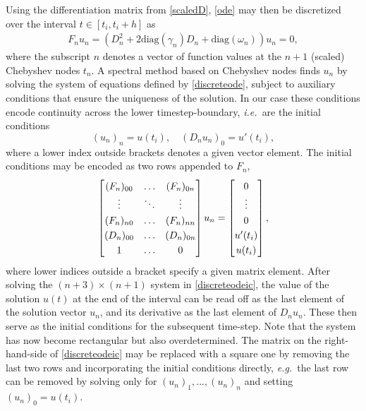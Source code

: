 \documentclass[10pt]{article}
\newcommand{\be}{\begin{equation}}
\newcommand{\ee}{\end{equation}}
\newcommand{\ie}{{\it i.e.\ }}
\newcommand{\eg}{{\it e.g.\ }}
\newcommand{\om}{\omega}
\newcommand{\g}{\gamma}
\begin{document}
Using the differentiation matrix from \cref{scaledD}, \cref{ode} may then be discretized over the interval $t \in [t_i, t_i+h]$ as
\begin{align}\label{discreteode}
    F_n u_n = \left(D_n^2 + 2\text{diag}(\g_n)D_n + \text{diag}(\om_n) \right)u_n = 0, 
\end{align}
where the subscript $n$ denotes a vector of function values at the $n+1$ (scaled) Chebyshev nodes $t_n$.
A spectral method based on Chebyshev nodes finds $u_n$ by solving the system of
equations defined by \cref{discreteode}, subject to auxiliary conditions that
ensure the uniqueness of the solution. In our case these conditions encode
continuity across the lower timestep-boundary, \ie are the initial conditions
\be\label{discreteic}
(u_n)_n = u(t_i), \quad \left(D_nu_n\right)_0 = u'(t_i),
\ee
where a lower index outside brackets denotes a given vector element.
The initial conditions may be encoded as two rows appended to $F_n$,
\be\label{discreteodeic}
\renewcommand*{\arraystretch}{1.25}
\begin{bmatrix}
    (F_n)_{00} & \ldots & (F_n)_{0n} \\
    \vdots & \ddots & \vdots \\
    (F_n)_{n0} & \ldots & (F_n)_{nn} \\
    (D_n)_{00} & \ldots & (D_n)_{0n} \\
    1 & \ldots & 0
\end{bmatrix}
u_n =  
\begin{bmatrix}
0 \\
\vdots \\
0 \\
u'(t_i) \\
u(t_i)
\end{bmatrix},
\ee
where lower indices outside a bracket specify a given matrix element.
After solving the $(n+3) \times (n+1)$ system in \cref{discreteodeic}, the value of the solution
$u(t)$ at the end of the interval can be read off as the last element of the
solution vector $u_n$, and its derivative as the last element of $D_nu_n$.
These then serve as the initial conditions for the subsequent time-step.
Note that the system has now become rectangular but also overdetermined. The
matrix on the right-hand-side of \cref{discreteodeic} may be replaced with a
square one by removing the last two rows and incorporating the initial
conditions directly, \eg the last row can be removed by solving only for
$(u_n)_1, \ldots, (u_n)_n$ and setting $(u_n)_0 = u(t_i)$.
\end{document}
